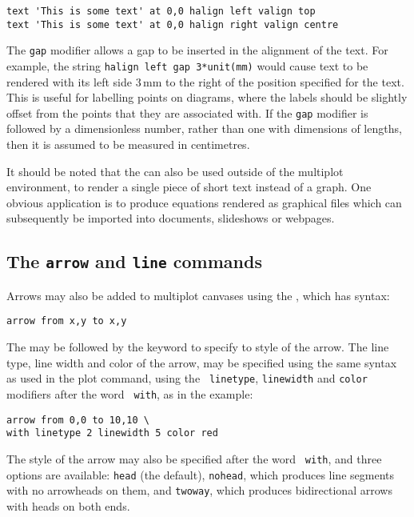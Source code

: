 \begin{verbatim}
text 'This is some text' at 0,0 halign left valign top
text 'This is some text' at 0,0 halign right valign centre
\end{verbatim}

\noindent The {\tt gap} modifier allows a gap to be inserted in the alignment
of the text. For example, the string {\tt halign left gap 3*unit(mm)} would
cause text to be rendered with its left side $3\,\mathrm{mm}$ to the right of
the position specified for the text. This is useful for labelling points on
diagrams, where the labels should be slightly offset from the points that they
are associated with. If the {\tt gap} modifier is followed by a dimensionless
number, rather than one with dimensions of lengths, then it is assumed to be
measured in centimetres.

It should be noted that the  can also be used outside of the
multiplot environment, to render a single piece of short text instead of a
graph. One obvious application is to produce equations rendered as graphical
files which can subsequently be imported into documents, slideshows or
webpages.

\subsection{The {\tt arrow} and {\tt line} commands}

Arrows may also be added to multiplot canvases using the , which
has syntax:

\begin{verbatim}
arrow from x,y to x,y
\end{verbatim}

The  may be followed by the  keyword to specify to
style of the arrow. The line type, line width and color of the arrow, may be
specified using the same syntax as used in the plot command, using the {\tt
linetype}, {\tt linewidth} and {\tt color} modifiers after the word {\tt
with}, as in the example:

\begin{verbatim}
arrow from 0,0 to 10,10 \
with linetype 2 linewidth 5 color red
\end{verbatim}

\noindent The style of the arrow may also be specified after the word {\tt
with}, and three options are available: {\tt head} (the default), {\tt nohead},
which produces line segments with no arrowheads on them, and {\tt twoway},
which produces bidirectional  arrows with heads on both ends.

